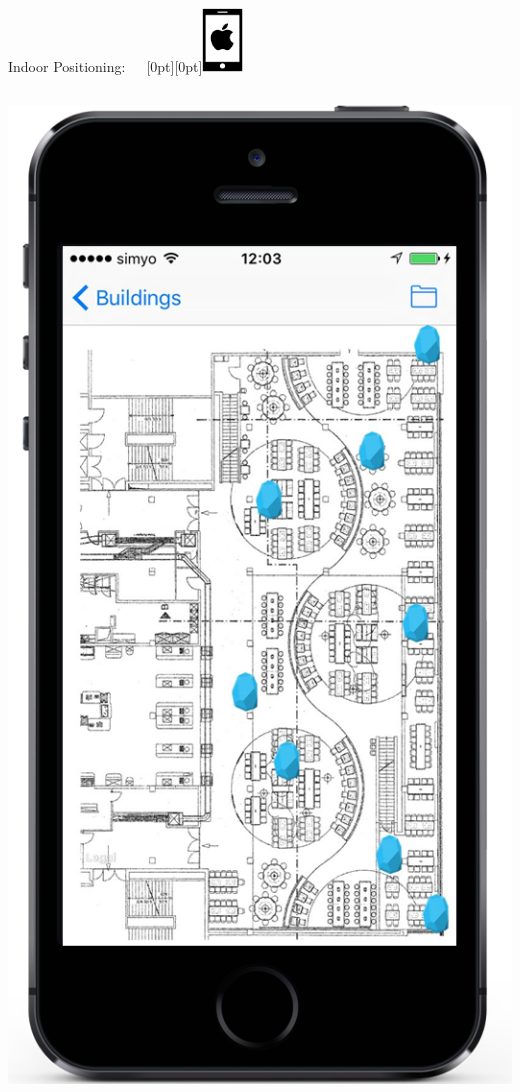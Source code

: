 \documentclass[11pt]{beamer}
\begin{document}
\begin{frame}{Indoor Positioning:~~~\raisebox{-10pt}[0pt][0pt]{\includegraphics[width=0.08\textwidth]{tech-stack-apple}}}
\begin{columns}[T]
\begin{column}{.4\textwidth}
  \includegraphics[scale=0.25]{beaconsonthemap}
  \end{column}
\end{columns}

\end{frame}
\end{document}
